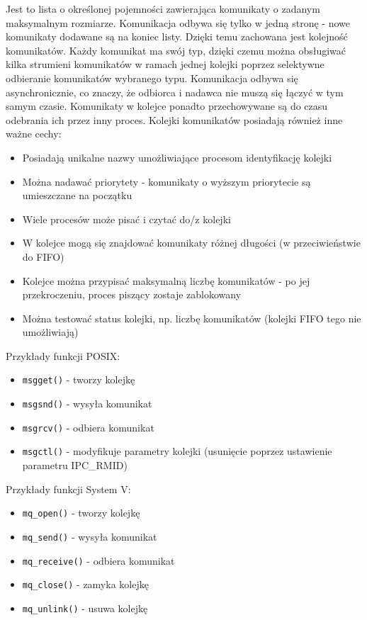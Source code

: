 Jest to lista o określonej pojemności zawierająca komunikaty o zadanym maksymalnym rozmiarze. Komunikacja odbywa się tylko w jedną stronę - nowe komunikaty dodawane są na koniec listy. Dzięki temu zachowana jest kolejność komunikatów. Każdy komunikat ma swój typ, dzięki czemu można obsługiwać kilka strumieni komunikatów w ramach jednej kolejki poprzez selektywne odbieranie komunikatów wybranego typu. Komunikacja odbywa się asynchronicznie, co znaczy, że odbiorca i nadawca nie muszą się łączyć w tym samym czasie. Komunikaty w kolejce ponadto przechowywane są do czasu odebrania ich przez inny proces. Kolejki komunikatów posiadają również inne ważne cechy:
\begin{itemize}
	\item Posiadają unikalne nazwy umożliwiające procesom identyfikację kolejki
    \item Można nadawać priorytety - komunikaty o wyższym priorytecie są umieszczane na początku
    \item Wiele procesów może pisać i czytać do/z kolejki
    \item W kolejce mogą się znajdować komunikaty różnej długości (w przeciwieństwie do FIFO)
    \item Kolejce można przypisać maksymalną liczbę komunikatów - po jej przekroczeniu, proces piszący zostaje zablokowany
    \item Można testować status kolejki, np. liczbę komunikatów (kolejki FIFO tego nie umożliwiają)
\end{itemize}

Przykłady funkcji POSIX:
\begin{itemize}
	\item \texttt{msgget()} - tworzy kolejkę
    \item \texttt{msgsnd()} - wysyła komunikat
    \item \texttt{msgrcv()} - odbiera komunikat
    \item \texttt{msgctl()} - modyfikuje parametry kolejki (usunięcie poprzez ustawienie parametru IPC\_RMID)
\end{itemize}

Przykłady funkcji System V:
\begin{itemize}
	\item \texttt{mq\_open()} - tworzy kolejkę
    \item \texttt{mq\_send()} - wysyła komunikat
    \item \texttt{mq\_receive()} - odbiera komunikat
    \item \texttt{mq\_close()} - zamyka kolejkę
    \item \texttt{mq\_unlink()} - usuwa kolejkę
\end{itemize}

